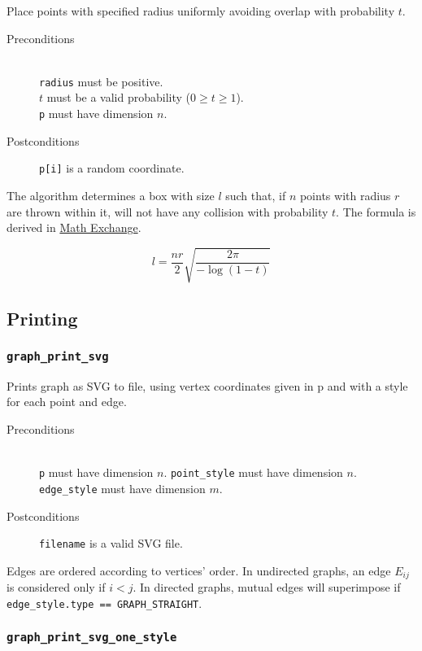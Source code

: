 Place points with specified radius uniformly avoiding overlap 
with probability $t$.

\begin{description}
 \item[Preconditions]~\\
   \texttt{radius} must be positive.\\
   $t$ must be a valid probability ($0 \ge t \ge 1$).\\
   \texttt{p} must have dimension $n$.
 \item[Postconditions] \texttt{p[i]} is a random coordinate.
\end{description}

The algorithm determines a box with size $l$ such that, if $n$ 
points with radius $r$ are thrown within it, will not have any 
collision with probability $t$. The formula is derived in 
\href{http://math.stackexchange.com/q/325844/37667}{Math Exchange}.

\begin{equation*}
 l = \frac{nr}{2} \sqrt{\frac{2 \pi}{-\log(1-t)}}
\end{equation*}

\subsection{Printing}

\subsubsection{\texttt{graph\_print\_svg}}

Prints graph as SVG to file, using vertex coordinates given in p and with a 
style for each point and edge.

\begin{description}
 \item[Preconditions]~\\
   \texttt{p} must have dimension $n$.
   \texttt{point\_style} must have dimension $n$.
   \texttt{edge\_style} must have dimension $m$.
 \item[Postconditions]
   \texttt{filename} is a valid SVG file.
\end{description}

Edges are ordered according to vertices' order. In undirected graphs, 
an edge $E_{ij}$ is considered only if $i < j$. In directed graphs,
mutual edges will superimpose if \texttt{edge\_style.type == GRAPH\_STRAIGHT}.

\subsubsection{\texttt{graph\_print\_svg\_one\_style}}

